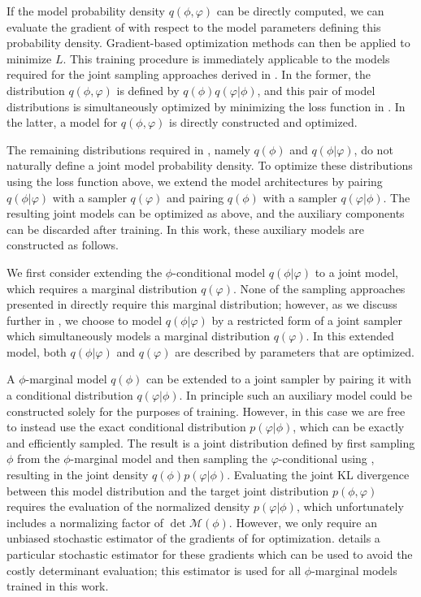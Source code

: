 \documentclass[aps,prd,twocolumn,nofootinbib,superscriptaddress,preprintnumbers]{revtex4-1}
\begin{document}
If the model probability density $q(\phi,\varphi)$ can be directly computed, we can evaluate the gradient of  with respect to the model parameters defining this probability density. Gradient-based optimization methods can then be applied to minimize $L$. This training procedure is immediately applicable to the models required for the joint sampling approaches derived in . In the former, the distribution $q(\phi,\varphi)$ is defined by $q(\phi)q(\varphi|\phi)$, and this pair of model distributions is simultaneously optimized by minimizing the loss function in . In the latter, a model for $q(\phi,\varphi)$ is directly constructed and optimized.

The remaining distributions required in , namely $q(\phi)$ and $q(\phi|\varphi)$, do not naturally define a joint model probability density. To optimize these distributions using the loss function above, we extend the model architectures by pairing $q(\phi | \varphi)$ with a sampler $q(\varphi)$ and pairing $q(\phi)$ with a sampler $q(\varphi | \phi)$. The resulting joint models can be optimized as above, and the auxiliary  components can be discarded after training. In this work, these auxiliary models are constructed as follows.

We first consider extending the $\phi$-conditional model $q(\phi|\varphi)$ to a joint model,  which requires a marginal distribution $q(\varphi)$. None of the sampling approaches presented in  directly require this marginal distribution; however, as we discuss further in , we choose to model $q(\phi|\varphi)$ by a restricted form of a joint sampler which simultaneously models a marginal distribution $q(\varphi)$. In this extended model, both $q(\phi | \varphi)$ and $q(\varphi)$ are described by parameters that are optimized.

A $\phi$-marginal model $q(\phi)$ can be extended to a joint sampler by pairing it with a conditional distribution $q(\varphi|\phi)$. In principle such an auxiliary model could be constructed solely for the purposes of training. However, in this case we are free to instead use the exact conditional distribution $p(\varphi|\phi)$, which can be exactly and efficiently sampled. The result is a joint distribution defined by first sampling $\phi$ from the $\phi$-marginal model and then sampling the $\varphi$-conditional using , resulting in the joint density ${q(\phi) p(\varphi|\phi)}$. Evaluating the joint KL divergence between this model distribution and the target joint distribution $p(\phi,\varphi)$ requires the evaluation of the normalized density $p(\varphi|\phi)$, which unfortunately includes a normalizing factor of $\det \mathcal{M}(\phi)$. However, we only require an unbiased stochastic estimator of the gradients of  for optimization.  details a particular stochastic estimator for these gradients which can be used to avoid the costly determinant evaluation; this estimator is used for all $\phi$-marginal models trained in this work.
\end{document}
